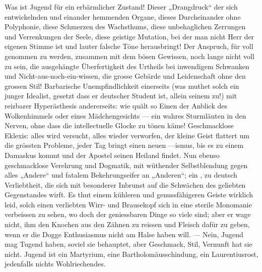 Was ist Jugend für ein erbärmlicher Zustand! Dieser „Drangdruck“ der sich entwickelnden und einander hemmenden Organe, dieses Durcheinander ohne Polyphonie, diese Schmerzen des Wachsthums, diese unbehaglichen Zerrungen und Verrenkungen der Seele, diese geistige Mutation, bei der man nicht Herr der eigenen Stimme ist und lauter falsche Töne herausbringt! Der Anspruch, für voll genommen zu werden, zusammen mit dem bösen Gewissen, noch lange nicht voll zu sein, die ausgehängte Überfertigkeit des Urtheils bei inwendigem Schwanken und Nicht-aus-noch-ein-wissen, die grosse Gebärde und Leidenschaft ohne den grossen Stil! Barbarische Unempfindlichkeit einerseits (was muthet solch ein junger Idealist, gesetzt dass er deutscher Student ist, allein seinem  zu!) mit reizbarer Hyperästhesis andererseits: wie quält so Einen der Anblick des Wolkenhimmels oder eines Mädchengesichts — ein wahres Sturmläuten in den Nerven, ohne dass die intellectuelle Glocke zu tönen käme! Geschmacklose Eklexis: alles wird versucht, alles wieder verworfen, der kleine Geist flattert um die grössten Probleme, jeder Tag bringt einen neuen —ismus, bis es zu einem Damaskus kommt und der Apostel seinen Heiland findet. Nun ebenso geschmacklose Verehrung und Dogmatik, mit wüthender Selbstblendung gegen alles „Andere“ und fatalem Bekehrungseifer an „Anderen“; ein , zu deutsch Verliebtheit, die sich mit besonderer Inbrunst auf die Schwächen des geliebten Gegenstandes wirft. Es thut einem kühleren und genussfähigeren Geiste wirklich leid, solch einen verliebten Wirr- und Brausekopf sich in eine sterile Monomanie verbeissen zu sehen, wo doch der geniessbaren Dinge so viele sind; aber er wage nicht, ihm den Knochen aus den Zähnen zu reissen und Fleisch dafür zu geben, wenn er die Dogge Enthusiasmus nicht am Halse haben will. — Nein, Jugend mag Tugend haben, soviel sie behauptet, aber Geschmack, Stil, Vernunft hat sie nicht. Jugend ist ein Martyrium, eine Bartholomäusschindung, ein Laurentiusrost, jedenfalls nichts Wohlriechendes.
\par

